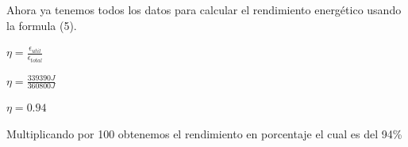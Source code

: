 \documentclass[]{article}
\begin{document}
\begin{flushleft}
	Ahora ya tenemos todos los datos para calcular el rendimiento energético usando la formula (5).
	
	\begin{center}
		$\eta = \frac{\epsilon_{util}}{\epsilon_{total}}$
	\end{center}
	\begin{center}
		$\eta = \frac{339390 J}{360800J}$
	\end{center}
	\begin{center}
		$\eta = 0.94$
	\end{center}
	
	Multiplicando por 100 obtenemos el rendimiento en porcentaje el cual es del 94\%
\end{flushleft}
\end{document}
